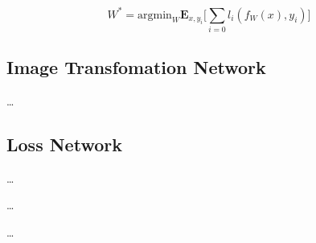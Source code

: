 \documentclass{article}
\begin{document}
{        \begin{equation}
            W^* = 
                \text{argmin}_W \textbf{E}_{x,y_i}
                \biggl[
                    \sum_{i=0} l_i(f_W(x), y_i)
                \biggr]
            \label{SGD}
        \end{equation}


        \subsection{Image Transfomation Network}
        \label{subsec:image-transform-net}


        …


        \subsection{Loss Network}
        \label{subsec:loss-net}

        …

    …
}

\label{sec:implementation}
{
    …
}
\end{document}
